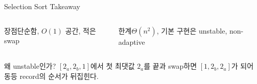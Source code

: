\begin{frame}{Selection Sort Takeaway}
\begin{columns}[T]\begin{block}{장점}단순함, $O(1)$ 공간, 적은 swap\end{block}\begin{alertblock}{한계}$\Theta(n^2)$, 기본 구현은 unstable, non-adaptive\end{alertblock}\end{columns}
\smallskip
\begin{exampleblock}{왜 unstable인가?}
$[2_a,2_b,1]$에서 첫 최댓값 $2_a$를 끝과 swap하면 $[1,2_b,2_a]$가 되어 동등 record의 순서가 뒤집힌다.
\end{exampleblock}
\end{frame}
